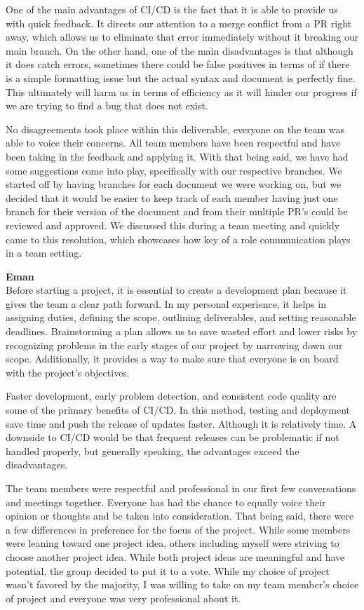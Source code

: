 \documentclass{article}
\begin{document}
One of the main advantages of CI/CD is the fact that it is able to provide us with quick feedback. It directs our attention to a merge conflict from a PR right away, which allows us to eliminate that error immediately without it breaking our main branch. On the other hand, one of the main disadvantages is that although it does catch errors, sometimes there could be false positives in terms of if there is a simple formatting issue but the actual syntax and document is perfectly fine. This ultimately will harm us in terms of efficiency as it will hinder our progress if we are trying to find a bug that does not exist.


No disagreements took place within this deliverable, everyone on the team was able to voice their concerns. All team members have been respectful and have been taking in the feedback and applying it. With that being said, we have had some suggestions come into play, specifically with our respective branches. We started off by having branches for each document we were working on, but we decided that it would be easier to keep track of each member having just one branch for their version of the document and from their multiple PR’s could be reviewed and approved. We discussed this during a team meeting and quickly came to this resolution, which showcases how key of a role communication plays in a team setting.

\textbf{Eman}\\

Before starting a project, it is essential to create a development plan because it gives the team a clear path forward. In my personal experience, it helps in assigning duties, defining the scope, outlining deliverables, and setting reasonable deadlines. Brainstorming a plan allows us to save wasted effort and lower risks by recognizing problems in the early stages of our project by narrowing down our scope. Additionally, it provides a way to make sure that everyone is on board with the project's objectives. 

Faster development, early problem detection, and consistent code quality are some of the primary benefits of CI/CD. In this method, testing and deployment save time and push the release of updates faster. Although it is relatively time. A downside to CI/CD would be that frequent releases can be problematic if not handled properly, but generally speaking, the advantages exceed the disadvantages.

The team members were respectful and professional in our first few conversations and meetings together. Everyone has had the chance to equally voice their opinion or thoughts and be taken into consideration. That being said, there were a few differences in preference for the focus of the project. While some members were leaning toward one project idea, others including myself were striving to choose another project idea. While both project ideas are meaningful and have potential, the group decided to put it to a vote. While my choice of project wasn’t favored by the majority, I was willing to take on my team member’s choice of project and everyone was very professional about it. \\
\end{document}
